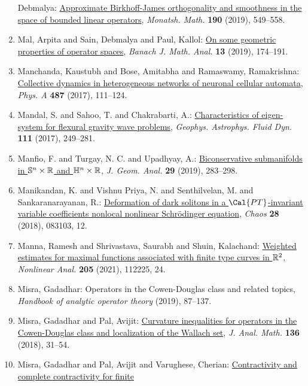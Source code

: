 \begin{enumerate}
Debmalya: \href{https://doi.org/10.1007/s00605-019-01289-3}{Approximate {B}irkhoff-{J}ames orthogonality and smoothness in
the space of bounded linear operators}, \emph{Monatsh. Math.} {\bf 190} (2019), 549--558.
\item Mal, Arpita and Sain, Debmalya and Paul, Kallol: \href{https://doi.org/10.1215/17358787-2018-0021}{On some geometric properties of operator spaces}, \emph{Banach J. Math. Anal.} {\bf 13} (2019), 174--191.
\item Manchanda, Kaustubh and Bose, Amitabha and Ramaswamy,
Ramakrishna: \href{https://doi.org/10.1016/j.physa.2017.06.021}{Collective dynamics in heterogeneous networks of neuronal
cellular automata}, \emph{Phys. A} {\bf 487} (2017), 111--124.
\item Mandal, S. and Sahoo, T. and Chakrabarti, A.: \href{https://doi.org/10.1080/03091929.2017.1318129}{Characteristics of eigen-system for flexural gravity wave
problems}, \emph{Geophys. Astrophys. Fluid Dyn.} {\bf 111} (2017), 249--281.
\item Manfio, F. and Turgay, N. C. and Upadhyay, A.: \href{https://doi.org/10.1007/s12220-018-9990-9}{Biconservative submanifolds in {$\Bbb{S}^n\times\Bbb{R}$} and
{$\Bbb{H}^n\times\Bbb{R}$}}, \emph{J. Geom. Anal.} {\bf 29} (2019), 283--298.
\item Manikandan, K. and Vishnu Priya, N. and Senthilvelan, M. and
Sankaranarayanan, R.: \href{https://doi.org/10.1063/1.5039901}{Deformation of dark solitons in a {$\Cal{PT}$}-invariant
variable coefficients nonlocal nonlinear {S}chr\"{o}dinger
equation}, \emph{Chaos} {\bf 28} (2018), 083103, 12.
\item Manna, Ramesh and Shrivastava, Saurabh and Shuin, Kalachand: \href{https://doi.org/10.1016/j.na.2020.112225}{Weighted estimates for maximal functions associated with
finite type curves in {$\Bbb R^2$}}, \emph{Nonlinear Anal.} {\bf 205} (2021), 112225, 24.
\item Misra, Gadadhar: Operators in the {C}owen-{D}ouglas class and related topics, \emph{Handbook of analytic operator theory} {\bf } (2019), 87--137.
\item Misra, Gadadhar and Pal, Avijit: \href{https://doi.org/10.1007/s11854-018-0054-7}{Curvature inequalities for operators in the {C}owen-{D}ouglas
class and localization of the {W}allach set}, \emph{J. Anal. Math.} {\bf 136} (2018), 31--54.
\item Misra, Gadadhar and Pal, Avijit and Varughese, Cherian: \href{https://doi.org/10.7900/jot.2018jun13.2225}{Contractivity and complete contractivity for finite
}
\end{enumerate}
